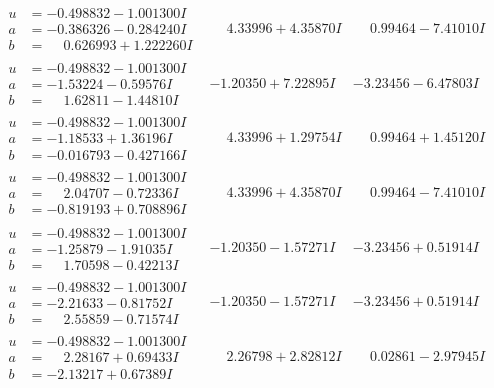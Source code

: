 \documentclass[1p]{elsarticle_modified}
\theoremstyle{definition}
\begin{document}
$$\begin{array}{c|c|c}
\begin{aligned}
u &= -0.498832 - 1.001300 I \\
a &= -0.386326 - 0.284240 I \\
b &= \phantom{-}0.626993 + 1.222260 I\end{aligned}
 & \phantom{-}4.33996 + 4.35870 I & \phantom{-}0.99464 - 7.41010 I \\ \hline\begin{aligned}
u &= -0.498832 - 1.001300 I \\
a &= -1.53224 - 0.59576 I \\
b &= \phantom{-}1.62811 - 1.44810 I\end{aligned}
 & -1.20350 + 7.22895 I & -3.23456 - 6.47803 I \\ \hline\begin{aligned}
u &= -0.498832 - 1.001300 I \\
a &= -1.18533 + 1.36196 I \\
b &= -0.016793 - 0.427166 I\end{aligned}
 & \phantom{-}4.33996 + 1.29754 I & \phantom{-}0.99464 + 1.45120 I \\ \hline\begin{aligned}
u &= -0.498832 - 1.001300 I \\
a &= \phantom{-}2.04707 - 0.72336 I \\
b &= -0.819193 + 0.708896 I\end{aligned}
 & \phantom{-}4.33996 + 4.35870 I & \phantom{-}0.99464 - 7.41010 I \\ \hline\begin{aligned}
u &= -0.498832 - 1.001300 I \\
a &= -1.25879 - 1.91035 I \\
b &= \phantom{-}1.70598 - 0.42213 I\end{aligned}
 & -1.20350 - 1.57271 I & -3.23456 + 0.51914 I \\ \hline\begin{aligned}
u &= -0.498832 - 1.001300 I \\
a &= -2.21633 - 0.81752 I \\
b &= \phantom{-}2.55859 - 0.71574 I\end{aligned}
 & -1.20350 - 1.57271 I & -3.23456 + 0.51914 I \\ \hline\begin{aligned}
u &= -0.498832 - 1.001300 I \\
a &= \phantom{-}2.28167 + 0.69433 I \\
b &= -2.13217 + 0.67389 I\end{aligned}
 & \phantom{-}2.26798 + 2.82812 I & \phantom{-}0.02861 - 2.97945 I \\ \hline\begin{aligned}

\end{aligned}
\end{array}$$
\end{document}
